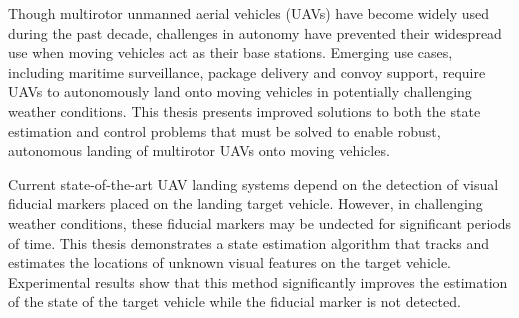\afterpage{\cleardoublepage}
Though multirotor unmanned aerial vehicles (UAVs) have become widely used 
during the past decade, challenges in autonomy have prevented their
widespread use when moving vehicles act as their base stations.
Emerging use cases, including maritime
surveillance, package delivery and convoy support, require UAVs to autonomously
land onto moving vehicles in potentially challenging weather
conditions.
This thesis presents improved solutions to both the state estimation and
control problems that must be solved
to enable robust, autonomous landing of multirotor UAVs onto moving vehicles.

Current state-of-the-art UAV landing systems depend on the detection of visual
fiducial markers placed on the landing target vehicle. However, in challenging
weather conditions, these fiducial markers may be undected for significant
periods of time.
This thesis demonstrates a state estimation algorithm that tracks and estimates
the locations of unknown visual features on the target vehicle.
Experimental results show that this method significantly improves the estimation of the
state of the target vehicle while the fiducial marker is not detected.

